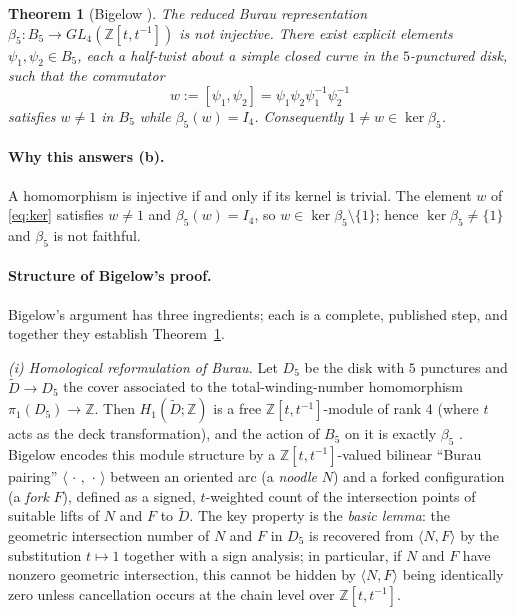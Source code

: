 \documentclass{amsart}
\newtheorem{theorem}{Theorem}
\theoremstyle{remark}
\begin{document}
\begin{theorem}[Bigelow {\cite[Theorem]{Bigelow1999}}]\label{thm:bigelow}
The reduced Burau representation $\beta_5:B_5\to GL_4(\mathbb Z[t,t^{-1}])$ is
not injective. There exist explicit elements $\psi_1,\psi_2\in B_5$, each a
half-twist about a simple closed curve in the $5$-punctured disk,
such that the commutator
\begin{equation}\label{eq:ker}
w:=[\psi_1,\psi_2]=\psi_1\psi_2\psi_1^{-1}\psi_2^{-1}
\end{equation}
satisfies $w\ne 1$ in $B_5$ while $\beta_5(w)=I_4$. Consequently
$1\ne w\in\ker\beta_5$.
\end{theorem}

\paragraph{Why this answers (b).}
A homomorphism is injective if and only if its kernel is trivial. The element
$w$ of \eqref{eq:ker} satisfies $w\ne1$ and $\beta_5(w)=I_4$, so
$w\in\ker\beta_5\setminus\{1\}$; hence $\ker\beta_5\ne\{1\}$ and $\beta_5$ is
not faithful.

\paragraph{Structure of Bigelow's proof.}
Bigelow's argument has three ingredients; each is a complete, published step,
and together they establish Theorem~\ref{thm:bigelow}.

\emph{(i) Homological reformulation of Burau.}
Let $D_5$ be the disk with $5$ punctures and $\widetilde D\to D_5$ the cover
associated to the total-winding-number homomorphism
$\pi_1(D_5)\to\mathbb Z$. Then $H_1(\widetilde D;\mathbb Z)$ is a free
$\mathbb Z[t,t^{-1}]$-module of rank $4$ (where $t$ acts as the deck
transformation), and the action of $B_5$ on it is exactly $\beta_5$
\cite[\S3.3]{KasselTuraev}. Bigelow encodes this module structure by a
$\mathbb Z[t,t^{-1}]$-valued bilinear ``Burau pairing''
$\langle\,\cdot\,,\,\cdot\,\rangle$ between an oriented arc (a \emph{noodle}
$N$) and a forked configuration (a \emph{fork} $F$), defined as a signed,
$t$-weighted count of the intersection points of suitable lifts of $N$ and $F$
to $\widetilde D$. The key property is the \emph{basic lemma}: the geometric
intersection number of $N$ and $F$ in $D_5$ is recovered from
$\langle N,F\rangle$ by the substitution $t\mapsto1$ together with a sign
analysis; in particular, if $N$ and $F$ have nonzero geometric intersection,
this cannot be hidden by $\langle N,F\rangle$ being identically zero unless
cancellation occurs at the chain level over $\mathbb Z[t,t^{-1}]$.
\end{document}
